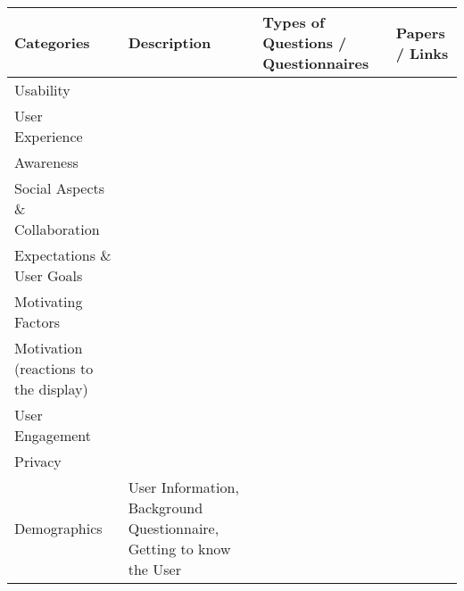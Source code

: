 		\label{table:ASDFTODO}
\begin{table}[h]
\begin{tabular}{|p{4cm}|p{6cm}|p{3cm}|p{2cm}|}
\textbf{Categories}                   & \textbf{Description}                                                  & \textbf{Types of Questions / Questionnaires} & \textbf{Papers / Links} \\ \hline
Usability                             &                                                                       &                                              &                         \\ \hline
User Experience                       &                                                                       &                                              &                         \\ \hline
Awareness                             &                                                                       &                                              &                         \\ \hline
Social Aspects \& Collaboration       &                                                                       &                                              &                         \\ \hline
Expectations \& User Goals            &                                                                       &                                              &                         \\ \hline
Motivating Factors                    &                                                                       &                                              &                         \\ \hline
Motivation (reactions to the display) &                                                                       &                                              &                         \\ \hline
User Engagement                       &                                                                       &                                              &                         \\ \hline
Privacy                               &                                                                       &                                              &                         \\ \hline
Demographics                          & User Information, Background Questionnaire, Getting to know the User  &                                              &                         \\ \hline

\end{tabular}
\end{table}
